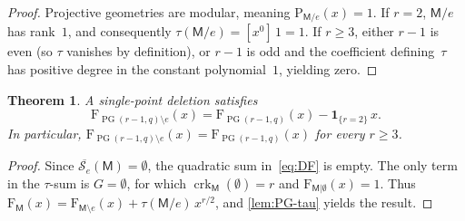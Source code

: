 \documentclass[12pt,letterpaper,english]{amsart}
\theoremstyle{teoremas}
\newtheorem{theorem}{Theorem}[section]
\theoremstyle{definition}
\DeclareMathOperator{\crk}{crk}
\DeclareMathOperator{\PG}{PG}
\newcommand{\M}{\mathsf{M}}
\newcommand{\PP}{\mathrm{P}}
\newcommand{\FF}{\mathrm{F}}
\newcommand{\Se}{\mathcal{S}_e}
\begin{document}
\begin{proof}
Projective geometries are modular, meaning $\PP_{\M/e}(x) = 1$.
If $r = 2$, $\M/e$ has rank~$1$, and consequently
$\tau(\M/e) = [x^0]\, 1 = 1$.
If $r \ge 3$, either $r-1$ is even (so $\tau$ vanishes by definition),
or $r-1$ is odd and the coefficient defining~$\tau$ has positive degree
in the constant polynomial~$1$, yielding zero.
\end{proof}

\begin{theorem}\label{thm:PG-del}
A single-point deletion satisfies
\begin{equation}\label{eq:PG-del}
\FF_{\PG(r-1,q) \setminus e}(x)
= \FF_{\PG(r-1,q)}(x) - \mathbf{1}_{\{r=2\}}\, x.
\end{equation}
In particular,
$\FF_{\PG(r-1,q) \setminus e}(x) = \FF_{\PG(r-1,q)}(x)$
for every $r \ge 3$.
\end{theorem}

\begin{proof}
Since $\overline{\Se}(\M) = \emptyset$, the quadratic sum
in~\eqref{eq:DF} is empty.  The only term in the $\tau$-sum is
$G = \emptyset$, for which $\crk_{\M}(\emptyset) = r$ and
$\FF_{\M|\emptyset}(x) = 1$.
Thus $\FF_{\M}(x) = \FF_{\M \setminus e}(x) + \tau(\M/e)\, x^{r/2}$,
and \cref{lem:PG-tau} yields the result.
\end{proof}


\end{document}
